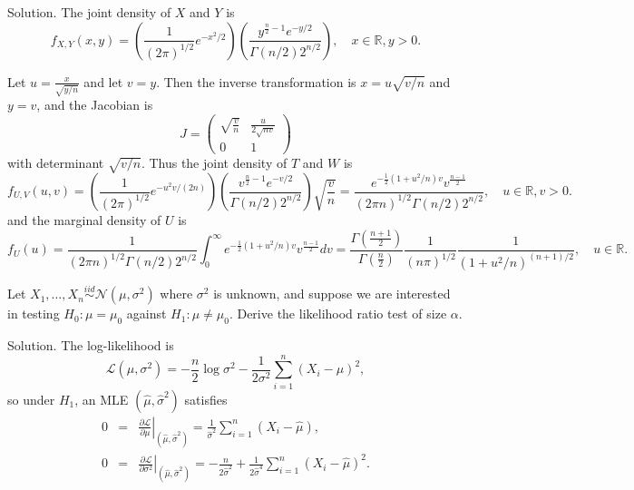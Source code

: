 Solution. The joint density of $X$ and $Y$ is
\begin{equation}
f_{X,Y}(x,y) = \left(\frac{1}{(2\pi)^{1/2}}e^{-x^2/2}\right)\left(\frac{y^{\frac n2-1}e^{-y/2}}{\Gamma(n/2)2^{n/2}}\right),\quad x\in\mathbb{R},y>0.
\end{equation}

Let $u=\frac{x}{\sqrt{y/n}}$ and let $v=y$. Then the inverse transformation is $x=u\sqrt{v/n}$ and $y=v$, and the Jacobian is
\begin{equation}
J=\left(
\begin{array}{cc}
\sqrt{\frac{v}{n}} & \frac{u}{2\sqrt{nv}} \\
0 & 1
\end{array}
\right)
\end{equation}
with determinant $\sqrt{v/n}$. Thus the joint density of $T$ and $W$ is
\begin{equation}
f_{U,V}(u,v) = \left(\frac{1}{(2\pi)^{1/2}}e^{-u^2v/(2n)}\right)\left(\frac{v^{\frac n2-1}e^{-v/2}}{\Gamma(n/2)2^{n/2}}\right)\sqrt{\frac{v}{n}}= \frac{e^{-\frac 12(1+u^2/n)v}v^{\frac{n-1}{2}}}{(2\pi n)^{1/2}\Gamma(n/2)2^{n/2} } ,\quad u\in\mathbb{R},v>0.
\end{equation}
and the marginal density of $U$ is
\begin{equation}
f_{U}(u) = \frac{1}{(2\pi n)^{1/2}\Gamma(n/2)2^{n/2}} \int^\infty_0 e^{-\frac 12(1+u^2/n)v}v^{\frac{n-1}{2}} dv = \frac{\Gamma\left(\frac{n+1}{2}\right)}{\Gamma\left(\frac{n}{2}\right)} \frac{1}{(n\pi)^{1/2}}\frac{1}{(1+u^2/n)^{(n+1)/2}}, \quad u\in \mathbb{R}.
\end{equation}





\item Let $X_1,\dots,X_n\stackrel{iid}{\sim}\mathcal{N}(\mu,\sigma^2)$ where $\sigma^2$ is unknown, and suppose we are interested in testing $H_0:\mu=\mu_0$ against $H_1:\mu\neq \mu_0$. Derive the likelihood ratio test of size $\alpha$.



Solution. The log-likelihood is
\begin{equation}
\mathcal{L}(\mu,\sigma^2) = -\frac{n}{2}\log\sigma^2 - \frac{1}{2\sigma^2}\sum^n_{i=1}(X_i-\mu)^2,
\end{equation}
so under $H_1$, an MLE $\left(\hat{\mu}, \hat{\sigma}^2\right)$ satisfies
\begin{eqnarray}
0 & = & \left.\frac{\partial\mathcal{L}}{\partial\mu}\right|_{\left(\hat{\mu}, \hat{\sigma}^2\right)} = \frac{1}{\hat{\sigma}^2}\sum^n_{i=1}(X_i-\hat{\mu}),  \nonumber\\
0 & = & \left.\frac{\partial\mathcal{L}}{\partial\sigma^2}\right|_{\left(\hat{\mu}, \hat{\sigma}^2\right)} = -\frac{n}{2\hat{\sigma}^2} + \frac{1}{2\hat{\sigma}^4}\sum^n_{i=1}(X_i-\hat{\mu})^2.
\end{eqnarray}

